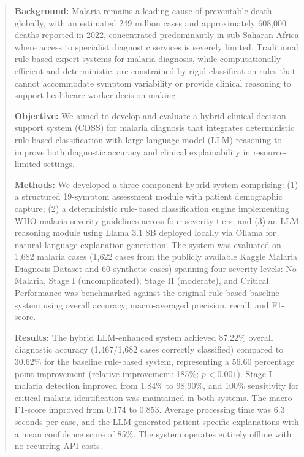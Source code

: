 \documentclass[12pt,a4paper]{article}
\begin{document}
\begin{abstract}
\textbf{Background:} Malaria remains a leading cause of preventable death globally, with an estimated 249 million cases and approximately 608,000 deaths reported in 2022, concentrated predominantly in sub-Saharan Africa where access to specialist diagnostic services is severely limited. Traditional rule-based expert systems for malaria diagnosis, while computationally efficient and deterministic, are constrained by rigid classification rules that cannot accommodate symptom variability or provide clinical reasoning to support healthcare worker decision-making.

\textbf{Objective:} We aimed to develop and evaluate a hybrid clinical decision support system (CDSS) for malaria diagnosis that integrates deterministic rule-based classification with large language model (LLM) reasoning to improve both diagnostic accuracy and clinical explainability in resource-limited settings.

\textbf{Methods:} We developed a three-component hybrid system comprising: (1) a structured 19-symptom assessment module with patient demographic capture; (2) a deterministic rule-based classification engine implementing WHO malaria severity guidelines across four severity tiers; and (3) an LLM reasoning module using Llama 3.1 8B deployed locally via Ollama for natural language explanation generation. The system was evaluated on 1,682 malaria cases (1,622 cases from the publicly available Kaggle Malaria Diagnosis Dataset and 60 synthetic cases) spanning four severity levels: No Malaria, Stage I (uncomplicated), Stage II (moderate), and Critical. Performance was benchmarked against the original rule-based baseline system using overall accuracy, macro-averaged precision, recall, and F1-score.

\textbf{Results:} The hybrid LLM-enhanced system achieved 87.22\% overall diagnostic accuracy (1,467/1,682 cases correctly classified) compared to 30.62\% for the baseline rule-based system, representing a 56.60 percentage point improvement (relative improvement: 185\%; $p<0.001$). Stage I malaria detection improved from 1.84\% to 98.90\%, and 100\% sensitivity for critical malaria identification was maintained in both systems. The macro F1-score improved from 0.174 to 0.853. Average processing time was 6.3 seconds per case, and the LLM generated patient-specific explanations with a mean confidence score of 85\%. The system operates entirely offline with no recurring API costs.


\end{abstract}
\end{document}
